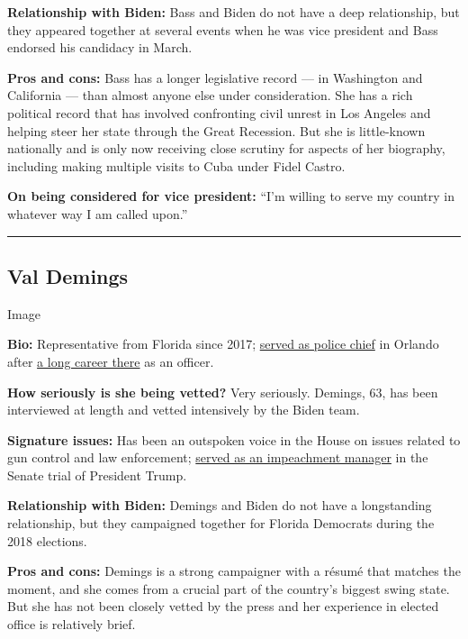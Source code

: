 \textbf{Relationship with Biden:} Bass and Biden do not have a deep
relationship, but they appeared together at several events when he was
vice president and Bass endorsed his candidacy in March.

\textbf{Pros and cons:} Bass has a longer legislative record --- in
Washington and California --- than almost anyone else under
consideration. She has a rich political record that has involved
confronting civil unrest in Los Angeles and helping steer her state
through the Great Recession. But she is little-known nationally and is
only now receiving close scrutiny for aspects of her biography,
including making multiple visits to Cuba under Fidel Castro.

\textbf{On being considered for vice president:} ``I'm willing to serve
my country in whatever way I am called upon.''

\begin{center}\rule{0.5\linewidth}{\linethickness}\end{center}

\hypertarget{val-demings}{%
\subsection{Val Demings}\label{val-demings}}

Image

\textbf{Bio:} Representative from Florida since 2017;
\href{https://www.nytimes3xbfgragh.onion/2020/01/15/us/politics/who-is-val-demings.html}{served
as police chief} in Orlando after
\href{https://www.nytimes3xbfgragh.onion/article/val-demings-biden-vp.html}{a
long career there} as an officer.

\textbf{How seriously is she being vetted?} Very seriously. Demings, 63,
has been interviewed at length and vetted intensively by the Biden team.

\textbf{Signature issues:} Has been an outspoken voice in the House on
issues related to gun control and law enforcement;
\href{https://www.nytimes3xbfgragh.onion/2020/01/15/us/politics/impeachment-briefing-meet-the-managers.html}{served
as an impeachment manager} in the Senate trial of President Trump.

\textbf{Relationship with Biden:} Demings and Biden do not have a
longstanding relationship, but they campaigned together for Florida
Democrats during the 2018 elections.

\textbf{Pros and cons:} Demings is a strong campaigner with a résumé
that matches the moment, and she comes from a crucial part of the
country's biggest swing state. But she has not been closely vetted by
the press and her experience in elected office is relatively brief.

